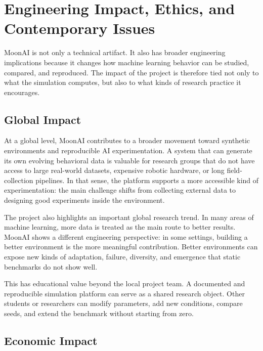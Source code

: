 \section{Engineering Impact, Ethics, and Contemporary Issues}
\label{sec:impact}

MoonAI is not only a technical artifact. It also has broader engineering implications because it
changes how machine learning behavior can be studied, compared, and reproduced. The impact of
the project is therefore tied not only to what the simulation computes, but also to what kinds
of research practice it encourages.

\subsection{Global Impact}

At a global level, MoonAI contributes to a broader movement toward synthetic environments and
reproducible AI experimentation. A system that can generate its own evolving behavioral data is
valuable for research groups that do not have access to large real-world datasets, expensive
robotic hardware, or long field-collection pipelines. In that sense, the platform supports a
more accessible kind of experimentation: the main challenge shifts from collecting external data
to designing good experiments inside the environment.

The project also highlights an important global research trend. In many areas of machine
learning, more data is treated as the main route to better results. MoonAI shows a different
engineering perspective: in some settings, building a better environment is the more meaningful
contribution. Better environments can expose new kinds of adaptation, failure, diversity, and
emergence that static benchmarks do not show well.

This has educational value beyond the local project team. A documented and reproducible
simulation platform can serve as a shared research object. Other students or researchers can
modify parameters, add new conditions, compare seeds, and extend the benchmark without starting
from zero.

\subsection{Economic Impact}

